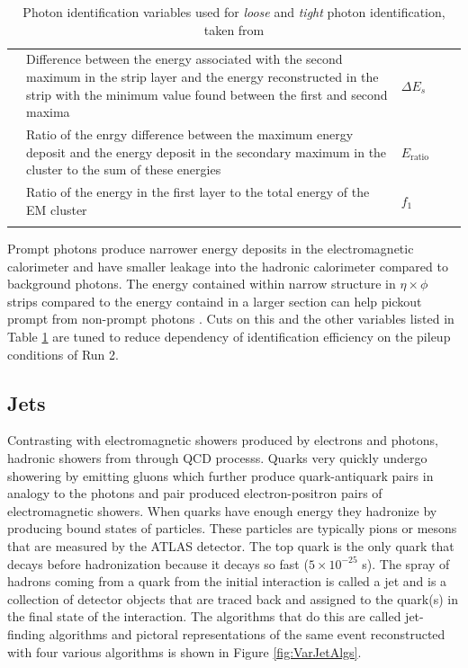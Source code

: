 \begin{center}
\begin{table}
{{\begin{tabularx}{1.25 \textwidth}{ l X lll }
		 & Difference between the energy associated with the second maximum in the strip layer and the energy reconstructed in the strip with the minimum value found between the first and second maxima & $\Delta E_s$ &  &   \checkmark \\
		 & Ratio of the enrgy difference between the maximum energy deposit and the energy deposit in the secondary maximum in the cluster to the sum of these energies & $E_\text{ratio}$ &  &  \checkmark \\
		 & Ratio of the energy in the first layer to the total energy of the EM cluster & $f_1$ &  &  \checkmark \\
\hhline{=====}
\end{tabularx}
\normalsize
}}
\caption[Photon identification variables used for \textit{loose} and \textit{tight} photon identification]{Photon identification variables used for \textit{loose} and \textit{tight} photon identification, taken from \cite{PhotonID}}
\label{tab:PhotonVars}

\end{table}
\end{center}

Prompt photons produce narrower energy deposits in the electromagnetic calorimeter and have smaller leakage into the hadronic calorimeter compared to background photons.  The energy contained within narrow structure in $\eta \times \phi$ strips compared to the energy containd in a larger section can help pickout prompt from non-prompt photons \cite{PhotonID}.  Cuts on this and the other variables listed in Table \ref{tab:PhotonVars} are tuned to reduce dependency of identification efficiency on the pileup conditions of Run 2.


\subsection{Jets}

Contrasting with electromagnetic showers produced by electrons and photons, hadronic showers from through QCD processs.  Quarks very quickly undergo showering by emitting gluons which further produce quark-antiquark pairs in analogy to the photons and pair produced electron-positron pairs of electromagnetic showers.   When quarks have enough energy they hadronize by producing bound states of particles.  These particles are typically pions or mesons that are measured by the ATLAS detector.  The top quark is the only quark that decays before hadronization because it decays so fast ($5\times10^{-25}$ s).  The spray of hadrons coming from a quark from the initial interaction is called a jet and is a collection of detector objects that are traced back and assigned to the quark(s) in the final state of the interaction.  The algorithms that do this are called jet-finding algorithms and pictoral representations of the same event reconstructed with four various algorithms is shown in Figure \ref{fig:VarJetAlgs}.

